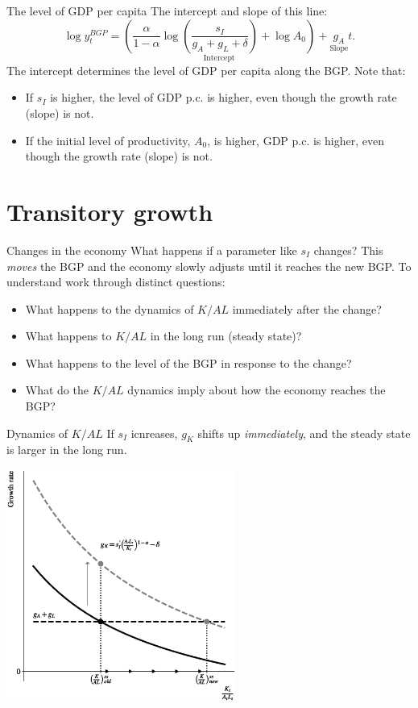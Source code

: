 \begin{frame}{The level of GDP per capita}
The intercept and slope of this line:
\begin{equation}
	\log y_t^{BGP} = \underset{\text{Intercept}}{\left(\frac{\alpha}{1-\alpha} \log \left(\frac{s_I}{g_A + g_L + \delta} \right) + \log A_0\right)} + \underset{\text{Slope}}{g_A} t. \nonumber
\end{equation}
The intercept determines the level of GDP per capita along the BGP. Note that:
\begin{itemize}
	\item If $s_I$ is higher, the level of GDP p.c. is higher, even though the growth rate (slope) is not.
	\item If the initial level of productivity, $A_0$, is higher, GDP p.c. is higher, even though the growth rate (slope) is not.
\end{itemize}
\end{frame}

\section{Transitory growth}
\begin{frame}{Changes in the economy}
What happens if a parameter like $s_I$ changes? This \textit{moves} the BGP and the economy slowly adjusts until it reaches the new BGP. To understand work through distinct questions:
\begin{itemize}
	\item What happens to the dynamics of $K/AL$ immediately after the change?
	\item What happens to $K/AL$ in the long run (steady state)?
	\item What happens to the level of the BGP in response to the change?
	\item What do the $K/AL$ dynamics imply about how the economy reaches the BGP?
\end{itemize}
\end{frame}

\begin{frame}{Dynamics of $K/AL$}
If $s_I$ icnreases, $g_K$ shifts up \textit{immediately}, and the steady state is larger in the long run.
\begin{center}
\includegraphics[height=3in]{../Figures/fig-ch2-fig3.eps}
\end{center}
\end{frame}

